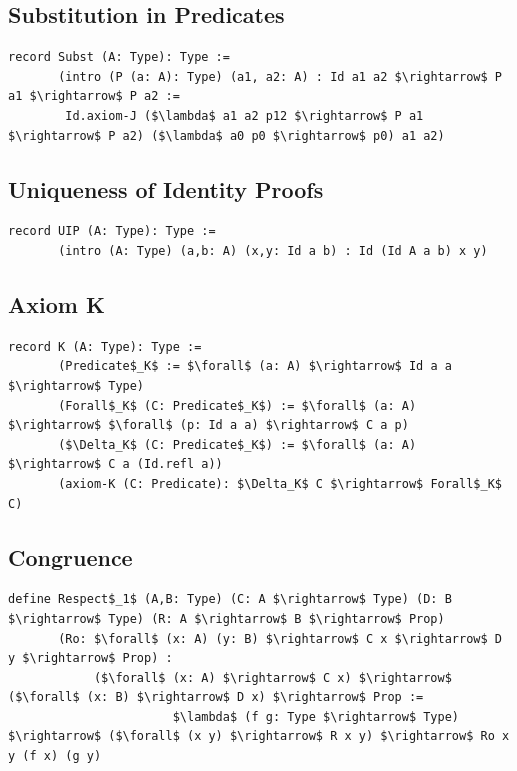 \documentclass[11pt,oneside]{article}
\begin{document}
\subsection{Substitution in Predicates}

\begin{lstlisting}[mathescape=true]
record Subst (A: Type): Type :=
       (intro (P (a: A): Type) (a1, a2: A) : Id a1 a2 $\rightarrow$ P a1 $\rightarrow$ P a2 :=
        Id.axiom-J ($\lambda$ a1 a2 p12 $\rightarrow$ P a1 $\rightarrow$ P a2) ($\lambda$ a0 p0 $\rightarrow$ p0) a1 a2)
\end{lstlisting}

\newpage
\subsection{Uniqueness of Identity Proofs}

\begin{lstlisting}[mathescape=true]
record UIP (A: Type): Type :=
       (intro (A: Type) (a,b: A) (x,y: Id a b) : Id (Id A a b) x y)
\end{lstlisting}

\subsection{Axiom K}

\begin{lstlisting}[mathescape=true]
record K (A: Type): Type :=
       (Predicate$_K$ := $\forall$ (a: A) $\rightarrow$ Id a a $\rightarrow$ Type)
       (Forall$_K$ (C: Predicate$_K$) := $\forall$ (a: A) $\rightarrow$ $\forall$ (p: Id a a) $\rightarrow$ C a p)
       ($\Delta_K$ (C: Predicate$_K$) := $\forall$ (a: A) $\rightarrow$ C a (Id.refl a))
       (axiom-K (C: Predicate): $\Delta_K$ C $\rightarrow$ Forall$_K$ C)
\end{lstlisting}

\subsection{Congruence}

\begin{lstlisting}[mathescape=true]
define Respect$_1$ (A,B: Type) (C: A $\rightarrow$ Type) (D: B $\rightarrow$ Type) (R: A $\rightarrow$ B $\rightarrow$ Prop)
       (Ro: $\forall$ (x: A) (y: B) $\rightarrow$ C x $\rightarrow$ D y $\rightarrow$ Prop) :
            ($\forall$ (x: A) $\rightarrow$ C x) $\rightarrow$ ($\forall$ (x: B) $\rightarrow$ D x) $\rightarrow$ Prop :=
                       $\lambda$ (f g: Type $\rightarrow$ Type) $\rightarrow$ ($\forall$ (x y) $\rightarrow$ R x y) $\rightarrow$ Ro x y (f x) (g y)
\end{lstlisting}
\end{document}
